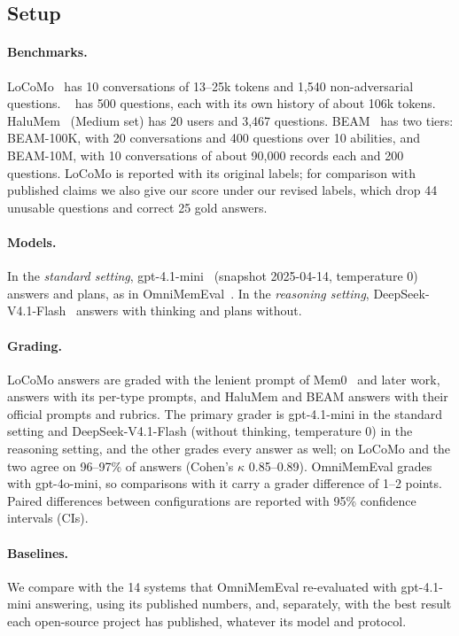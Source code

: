 \subsection{Setup}
\label{sec:setup}

\paragraph{Benchmarks.}
LoCoMo~\citep{maharana2024locomo} has 10 conversations of 13--25k tokens and 1,540 non-adversarial questions.
\lme~\citep{wu2025longmemeval,longmemeval_cleaned} has 500 questions, each with its own history of about 106k tokens.
HaluMem~\citep{halumem2025} (Medium set) has 20 users and 3,467 questions.
BEAM~\citep{beam2026} has two tiers: BEAM-100K, with 20 conversations and 400 questions over 10 abilities, and BEAM-10M, with 10 conversations of about 90,000 records each and 200 questions.
LoCoMo is reported with its original labels; for comparison with published claims we also give our score under our revised labels, which drop 44 unusable questions and correct 25 gold answers.

\paragraph{Models.}
In the \emph{standard setting}, gpt-4.1-mini~\citep{openai2025gpt41} (snapshot 2025-04-14, temperature 0) answers and plans, as in OmniMemEval~\citep{omnimemeval2026}.
In the \emph{reasoning setting}, DeepSeek-V4.1-Flash~\citep{deepseekflash2026} answers with thinking and plans without.

\paragraph{Grading.}
LoCoMo answers are graded with the lenient prompt of Mem0~\citep{chhikara2025mem0} and later work, \lme{} answers with its per-type prompts, and HaluMem and BEAM answers with their official prompts and rubrics.
The primary grader is gpt-4.1-mini in the standard setting and DeepSeek-V4.1-Flash (without thinking, temperature 0) in the reasoning setting, and the other grades every answer as well; on LoCoMo and \lme{} the two agree on 96--97\% of answers (Cohen's $\kappa$ 0.85--0.89).
OmniMemEval grades with gpt-4o-mini, so comparisons with it carry a grader difference of 1--2 points.
Paired differences between configurations are reported with 95\% confidence intervals (CIs).

\paragraph{Baselines.}
We compare \sys{} with the 14 systems that OmniMemEval re-evaluated with gpt-4.1-mini answering, using its published numbers, and, separately, with the best result each open-source project has published, whatever its model and protocol.

